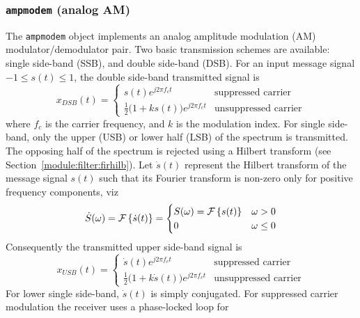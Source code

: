 \subsubsection{{\tt ampmodem} (analog AM)}
\label{module:modem:analog:ampmodem}
The {\tt ampmodem} object implements an analog amplitude modulation (AM)
modulator/demodulator pair.
Two basic transmission schemes are available:
single side-band (SSB), and
double side-band (DSB).
%
For an input message signal $-1 \le s(t) \le 1$, the double side-band
transmitted signal is
%
\begin{equation}
\label{eqn:modem:ampmodem:dsb_tx}
    x_{DSB}(t) = 
    \begin{cases}
        s(t)e^{j 2 \pi f_c t}   &   \text{suppressed carrier} \\
        \frac{1}{2}\bigl(1+ks(t)\bigr)e^{j 2 \pi f_c t}   &   \text{unsuppressed carrier}
    \end{cases}
\end{equation}
%
where $f_c$ is the carrier frequency, and $k$ is the modulation index.
%
For single side-band, only the upper (USB) or lower half (LSB)
of the spectrum is transmitted.
The opposing half of the spectrum is rejected using a Hilbert transform
(see Section~\ref{module:filter:firhilb}).
Let $\dot{s}(t)$ represent the Hilbert transform of the message signal
$s(t)$ such that its Fourier transform is non-zero only for positive
frequency components, viz
%
\begin{equation}
\label{eqn:modem:ampmodem:ssb_hilbert}
    \dot{S}(\omega) = \mathcal{F}\left\{ \dot{s}(t) \right\} =
    \begin{cases}
        S(\omega) = \mathcal{F}\left\{ s(t) \right\} & \omega > 0 \\
        0                                   & \omega \leq 0
    \end{cases}
\end{equation}
%
Consequently the transmitted upper side-band signal is
%
\begin{equation}
\label{eqn:modem:ampmodem:ssb_tx}
    x_{USB}(t) = 
    \begin{cases}
        \dot{s}(t)e^{j 2 \pi f_c t}   &   \text{suppressed carrier} \\
        \frac{1}{2}\bigl(1+k\dot{s}(t)\bigr)e^{j 2 \pi f_c t}   &   \text{unsuppressed carrier}
    \end{cases}
\end{equation}
%
For lower single side-band, $\dot{s}(t)$ is simply conjugated.
%
For suppressed carrier modulation the receiver uses a phase-locked loop for
